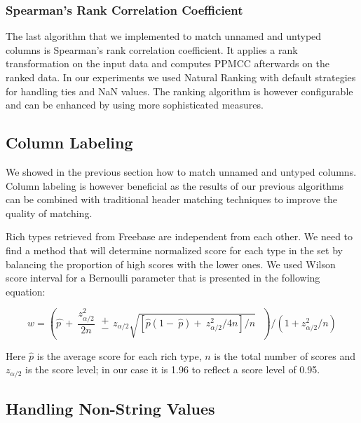 \subsubsection{Spearman's Rank Correlation Coefficient}

The last algorithm that we implemented to match unnamed and untyped columns is Spearman's rank correlation coefficient. It applies a rank transformation on the input data and computes PPMCC afterwards on the ranked data. In our experiments we used Natural Ranking with default strategies for handling ties and NaN values. The ranking algorithm is however configurable and can be enhanced by using more sophisticated measures.


\subsection{Column Labeling}

We showed in the previous section how to match unnamed and untyped columns. Column labeling is however beneficial as the results of our previous algorithms can be combined with traditional header matching techniques to improve the quality of matching.

Rich types retrieved from Freebase are independent from each other. We need to find a method that will determine normalized score for each type in the set by balancing the proportion of high scores with the lower ones. We used Wilson score interval for a Bernoulli parameter that is presented in the following equation:

\begin{equation}\label{equation:equation_10}
w={\left(\widehat{p\ }+\ \frac{z^2_{{\alpha }/{2}}}{2n}\  \begin{array}{c}
+ \\
- \end{array}
z_{{\alpha }/{2}}\sqrt{{\left[\hat{p}\left(1-\ \hat{p}\right)+\ {z^2_{{\alpha }/{2}}}/{4n}\right]}/{n}}\ \ \ \right)}/{\left(1+{z^2_{{\alpha }/{2}}}/{n}\right)}
\end{equation}

Here $\hat{p}$ is the average score for each rich type, $n$ is the total number of scores and $z_{{\alpha }/{2}}$ is the score level; in our case it is 1.96 to reflect a score level of 0.95.

\subsection{Handling Non-String Values}

